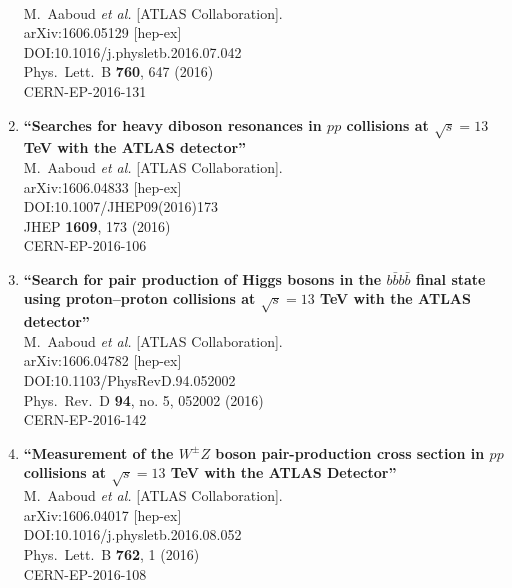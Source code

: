 \documentclass{article}
\begin{document}
\begin{enumerate}
  \\{}M.~Aaboud {\it et al.} [ATLAS Collaboration].
  \\{}arXiv:1606.05129 [hep-ex]
  \\{}DOI:10.1016/j.physletb.2016.07.042
  \\{}Phys.\ Lett.\ B {\bf 760}, 647 (2016)
  \\{}CERN-EP-2016-131
\item%
{\bf ``Searches for heavy diboson resonances in $pp$ collisions at $\sqrt{s}=13$ TeV with the ATLAS detector''}
  \\{}M.~Aaboud {\it et al.} [ATLAS Collaboration].
  \\{}arXiv:1606.04833 [hep-ex]
  \\{}DOI:10.1007/JHEP09(2016)173
  \\{}JHEP {\bf 1609}, 173 (2016)
  \\{}CERN-EP-2016-106
\item%
{\bf ``Search for pair production of Higgs bosons in the $b\bar{b}b\bar{b}$ final state using proton--proton collisions at $\sqrt{s} = 13$ TeV with the ATLAS detector''}
  \\{}M.~Aaboud {\it et al.} [ATLAS Collaboration].
  \\{}arXiv:1606.04782 [hep-ex]
  \\{}DOI:10.1103/PhysRevD.94.052002
  \\{}Phys.\ Rev.\ D {\bf 94}, no. 5, 052002 (2016)
  \\{}CERN-EP-2016-142
\item%
{\bf ``Measurement of the $W^{\pm}Z$ boson pair-production cross section in $pp$ collisions at $\sqrt{s}=13$ TeV with the ATLAS Detector''}
  \\{}M.~Aaboud {\it et al.} [ATLAS Collaboration].
  \\{}arXiv:1606.04017 [hep-ex]
  \\{}DOI:10.1016/j.physletb.2016.08.052
  \\{}Phys.\ Lett.\ B {\bf 762}, 1 (2016)
  \\{}CERN-EP-2016-108

\end{enumerate}
\end{document}
